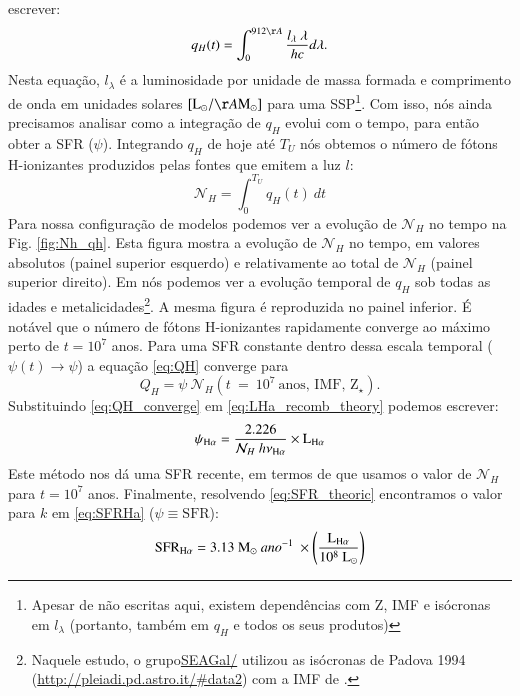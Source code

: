 escrever:
\begin{equation}
	q_H(t) = \int_0^{912\AA} \frac{l_\lambda\ \lambda}{h c} d\lambda.
	\label{eq:qH}
\end{equation}
\noindent Nesta equação, $l_\lambda$ é a luminosidade por unidade de massa formada e comprimento de
onda em unidades solares $[\textrm{L}_\odot/\AA\textrm{M}_\odot]$ para uma SSP\footnote{Apesar de
não escritas aqui, existem dependências com Z, IMF e isócronas em $l_\lambda$ (portanto, também em
$q_H$ e todos os seus produtos)}. Com isso, nós ainda precisamos analisar como a integração de
$q_H$ evolui com o tempo, para então obter a SFR ($\psi$). Integrando $q_H$ de hoje até $T_U$ nós
obtemos o número de fótons H-ionizantes produzidos pelas fontes que emitem a luz $l$:
\begin{equation}
	\mathcal{N}_H = \int_0^{T_U} q_H(t)\ dt
\end{equation}
Para nossa configuração de modelos podemos ver a evolução de $\mathcal{N}_H$ no tempo na Fig.
\ref{fig:Nh_qh}. Esta figura mostra a evolução de $\mathcal{N}_H$ no tempo, em valores absolutos
(painel superior esquerdo) e relativamente ao total de $\mathcal{N}_H$ (painel superior direito).
Em \citet[Fig. 2b]{CidFernandes.etal.2011a} nós podemos ver a evolução temporal de $q_H$ sob
todas as idades e metalicidades\footnote{Naquele estudo, o
grupo\href{http://starlight.ufsc.br}{SEAGal/\STARLIGHT} utilizou as isócronas de Padova 1994
(\href{http://pleiadi.pd.astro.it/#data2}{http://pleiadi.pd.astro.it/\#data2}) com a IMF de
\citet{Chabrier.2003a}.}. A mesma figura é reproduzida no painel inferior. É notável que o número de
fótons H-ionizantes rapidamente converge ao máximo perto de $t = 10^7$ anos. Para uma SFR constante
dentro dessa escala temporal ($\psi(t)\rightarrow \psi$) a equação \eqref{eq:QH} converge para
\begin{equation}
	Q_H = \psi\ \mathcal{N}_H(t\ =\ 10^7\ \textrm{anos, IMF, Z}{}_\star).
	\label{eq:QH_converge}
\end{equation}
\noindent Substituindo \eqref{eq:QH_converge} em \eqref{eq:LHa_recomb_theory} podemos escrever:
\begin{equation}
	\psi_{\Halpha} = \frac{2.226}{\mathcal{N}_H\ h \nu_{\Halpha}} \times \LHalpha
	\label{eq:SFR_theoric}
\end{equation}
\noindent Este método nos dá uma SFR recente, em termos de que usamos o valor de $\mathcal{N}_H$
para $t = 10^7$ anos. Finalmente, resolvendo \eqref{eq:SFR_theoric} encontramos o valor para $k$ em
\eqref{eq:SFRHa} ($\psi \equiv \mathrm{SFR}$):
\begin{equation}
	\mathrm{SFR}_{\Halpha} = 3.13\ \mathrm{M}_\odot\ ano^{-1}\ \times
\left(\frac{\LHalpha}{10^8\ \mathrm{L}_\odot}\right)
	\label{eq:SFRNeb}
\end{equation}

